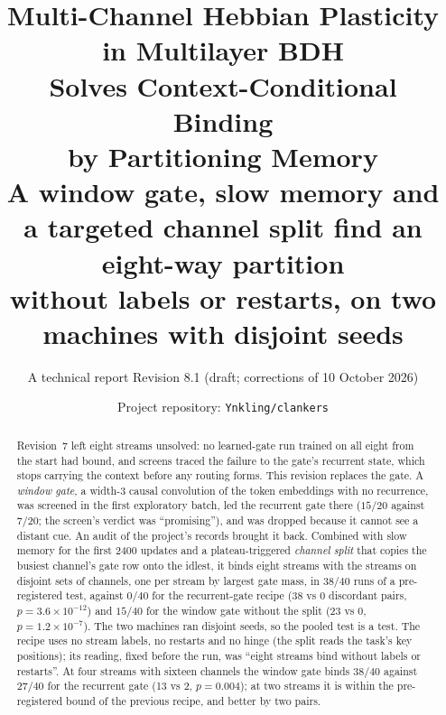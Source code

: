 \documentclass[11pt]{article}
\title{\vspace{-2.5em}\bfseries Multi-Channel Hebbian Plasticity in Multilayer BDH\\
Solves Context-Conditional Binding\\ by Partitioning Memory\\[0.3em]
\large\normalfont A window gate, slow memory and a targeted channel split find an eight-way partition\\ without labels or restarts, on two machines with disjoint seeds}
\author{A technical report \quad\textbullet\quad Revision 8.1 (draft; corrections of 10 October 2026)}
\date{Project repository: \texttt{Ynkling/clankers}}
\begin{document}
\maketitle
\vspace{-1.5em}

\begin{abstract}
\noindent
Revision~7 left eight streams unsolved: no learned-gate run trained on all eight from the start had bound, and screens traced the failure to the gate's recurrent state, which stops carrying the context before any routing forms. This revision replaces the gate. A \emph{window gate}, a width-3 causal convolution of the token embeddings with no recurrence, was screened in the first exploratory batch, led the recurrent gate there ($15/20$ against $7/20$; the screen's verdict was ``promising''), and was dropped because it cannot see a distant cue. An audit of the project's records brought it back. Combined with slow memory for the first 2400 updates and a plateau-triggered \emph{channel split} that copies the busiest channel's gate row onto the idlest, it binds eight streams with the streams on disjoint sets of channels, one per stream by largest gate mass, in $38/40$ runs of a pre-registered test, against $0/40$ for the recurrent-gate recipe (38 vs 0 discordant pairs, $p = 3.6\times10^{-12}$) and $15/40$ for the window gate without the split (23 vs 0, $p = 1.2\times10^{-7}$). The two machines ran disjoint seeds, so the pooled test is a test. The recipe uses no stream labels, no restarts and no hinge (the split reads the task's key positions); its reading, fixed before the run, was ``eight streams bind without labels or restarts''. At four streams with sixteen channels the window gate binds $38/40$ against $27/40$ for the recurrent gate (13 vs 2, $p = 0.004$); at two streams it is within the pre-registered bound of the previous recipe, and better by two pairs.


\end{abstract}
\end{document}
